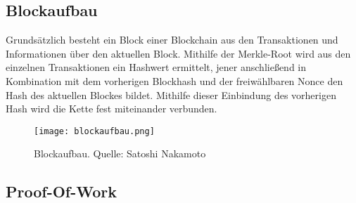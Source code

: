 \subsection{Blockaufbau}
\label{subsec:blockaufbau}
Grundsätzlich besteht ein Block einer Blockchain aus den Transaktionen und Informationen über den aktuellen Block. Mithilfe der Merkle-Root wird aus den einzelnen Transaktionen ein Hashwert ermittelt, jener anschließend in Kombination mit dem vorherigen Blockhash und der freiwählbaren Nonce den Hash des aktuellen Blockes bildet. Mithilfe dieser Einbindung des vorherigen Hash wird die Kette fest miteinander verbunden.

\begin{figure}[h]
	\texttt{[image: blockaufbau.png]}
	\caption{Blockaufbau. Quelle: Satoshi Nakamoto}
	\label{fig:blockaufbau}
\end{figure}


\subsection{Proof-Of-Work}
\label{subsec:proofofwork}
